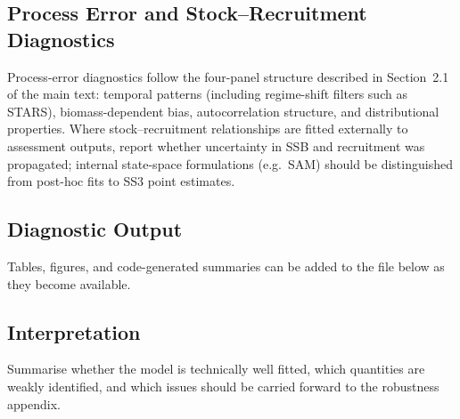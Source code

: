 

\subsection{Process Error and Stock--Recruitment Diagnostics}

Process-error diagnostics follow the four-panel structure described in Section~2.1 of the main text: temporal patterns (including regime-shift filters such as STARS), biomass-dependent bias, autocorrelation structure, and distributional properties. Where stock--recruitment relationships are fitted externally to assessment outputs, report whether uncertainty in SSB and recruitment was propagated; internal state-space formulations (e.g.\ SAM) should be distinguished from post-hoc fits to SS3 point estimates.



\subsection{Diagnostic Output}

Tables, figures, and code-generated summaries can be added to the file below as they
become available.



\subsection{Interpretation}

Summarise whether the model is technically well fitted, which quantities are weakly
identified, and which issues should be carried forward to the robustness appendix.


